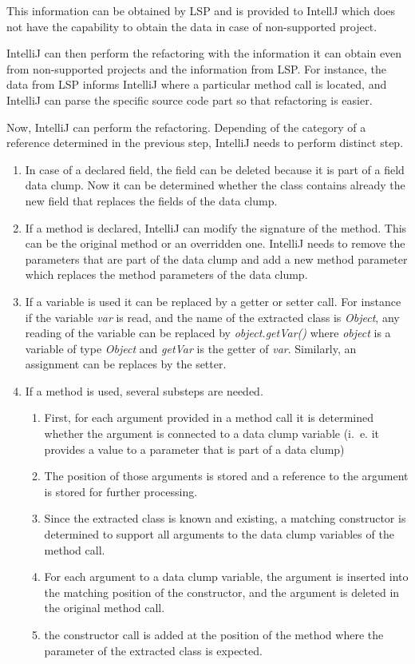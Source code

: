 This information can be obtained by \ac{LSP} and is provided to IntellJ which does not have the capability to obtain the data in case of non-supported project.

IntelliJ can then perform the refactoring with the information it can obtain even from non-supported projects and the information from \ac{LSP}. For instance, the data from \ac{LSP} informs IntelliJ where a particular method call is located, and IntelliJ can parse the specific source code part so that refactoring is easier.

Now, IntelliJ can perform the refactoring. Depending of the category of a reference determined in the previous step, IntelliJ needs to perform distinct step. 
\begin{enumerate}
    \item In case of a declared field, the field can be deleted because it is part of a field data clump. Now it can be determined whether the class contains already the new field that replaces the fields of the data clump.
    \item If a method is declared, IntelliJ can modify the signature of the method. This can be the original method or an overridden one. IntelliJ needs to remove the parameters that are part of the data clump and add a new method parameter which replaces the method parameters of the data clump. 
    \item If a variable is used it can be replaced by a getter or setter call. For instance if the variable \textit{var} is read, and the name of the extracted class is \textit{Object}, any reading of the variable can be replaced by  \textit{object.getVar()} where \textit{object} is a variable of type \textit{Object} and \textit{getVar} is the getter of \textit{var}. Similarly, an assignment can be replaces by the setter.
    \item If a method is used, several substeps are needed.
    \begin{enumerate}
        \item First, for each argument provided in a method call it is determined whether the argument is connected to a data clump variable (i.~e. it provides a value to a parameter that is part of a data clump) 
        \item The position of those arguments is stored and a reference to the argument is stored for further processing.
        \item Since the extracted class is known and existing, a matching constructor is determined to support all arguments to the data clump variables of the method call. 
        \item For each argument to a data clump variable, the argument is inserted into the matching position of the constructor, and the argument is deleted in the original method call. 
        \item the constructor call is added at the position of the method  where the parameter of the extracted class is expected. 
        
    \end{enumerate}
    
\end{enumerate}

